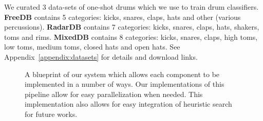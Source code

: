 \documentclass[runningheads,a4paper]{llncs}
\begin{document}
We curated 3 data-sets of one-shot drums which we use to train drum classifiers. \textbf{FreeDB} contains 5 categories: kicks, snares, claps, hats and other (various percussions). \textbf{RadarDB} contains 7 categories: kicks, snares, claps, hats, shakers, toms and rims. \textbf{MixedDB} contains 8 categories: kicks, snares, claps, high toms, low toms, medium toms, closed hats and open hats. See Appendix~\ref{appendix:datasets} for details and download links.   
 \begin{figure}[tbp]
    \begin{center}
    \end{center}
    \caption{A blueprint of our system which allows each component to be implemented in a number of ways. Our implementations of this pipeline allow for easy parallelization when needed. This implementation also allows for easy integration of heuristic search for future works. 
    }
\label{fig:pipeline_outline}
\end{figure}
\end{document}
